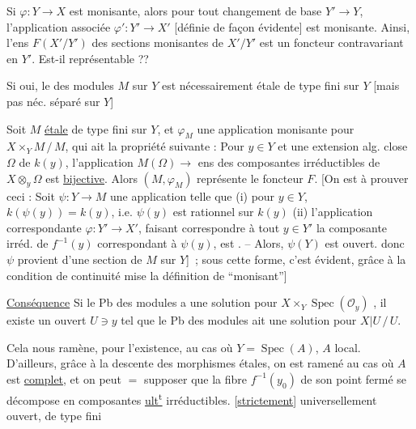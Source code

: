 Si $\varphi:Y\to X$ est monisante, alors pour tout changement de base $Y'\to Y$, l'application associée $\varphi':Y'\to X'$ [définie de façon évidente] est monisante. Ainsi, l'ens
$F(X'/Y')$ des sections monisantes de $X'/Y'$ est un foncteur contravariant en $Y'$. Est-il représentable ??

Si oui, le  des modules $M$ sur $Y$ est nécessairement étale de type fini sur $Y$ [mais pas néc. séparé sur $Y$]

Soit $M$ \uline{étale} de type fini sur $Y$, et $\varphi_M$ une  application monisante pour $X\times_Y M\,/\,M$, qui ait la propriété suivante : Pour  $y\in Y$ et une extension alg. close $\Omega$ de $k(y)$, l'application $M(\Omega)\to{}$ ens des composantes irréductibles de $X\otimes_y\Omega$ est \uline{bijective}. Alors $(M,\varphi_M)$ représente le foncteur $F$.
[On est  à prouver ceci : Soit $\psi:Y\to M$ une application telle que (i) pour  $y\in Y$, $k(\psi(y))=k(y)$, i.e. $\psi(y)$ est rationnel sur $k(y)$ (ii) l'application correspondante $\varphi:Y'\to X'$,  faisant correspondre à tout $y\in Y'$ la composante  irréd. de $f^{-1}(y)$ correspondant à  $\psi(y)$, est . -- Alors,  $\psi(Y)$ est  ouvert.  donc $\psi$ provient d'une section de $M$ sur $Y$]~; sous cette forme, c'est évident, grâce à la condition de continuité mise  la définition de ``monisant'']

\uline{Conséquence} Si le Pb des modules a une solution pour $X\times_Y\operatorname{Spec}(\mathcal O_y)$ ,  il existe un ouvert $U\ni y$ tel que le Pb des modules ait une solution pour $X|U\,/\,U$.

Cela nous ramène, pour l'existence, au cas où  $Y=\operatorname{Spec}(A)$, $A$ local. \inserted{[Car \deleted{\unsure{tt}} alors supposons \unsure{$\dim Y=n<+\infty$}]} D'ailleurs, grâce à la descente des morphismes étales, on est ramené au cas où $A$ est \uline{complet},
et on peut $=$ supposer que la fibre $f^{-1}(y_0)$ de son point fermé se décompose en composantes \uline{ult\textsuperscript{t}} irréductibles.
[\uline{strictement}] universellement ouvert, de type fini

